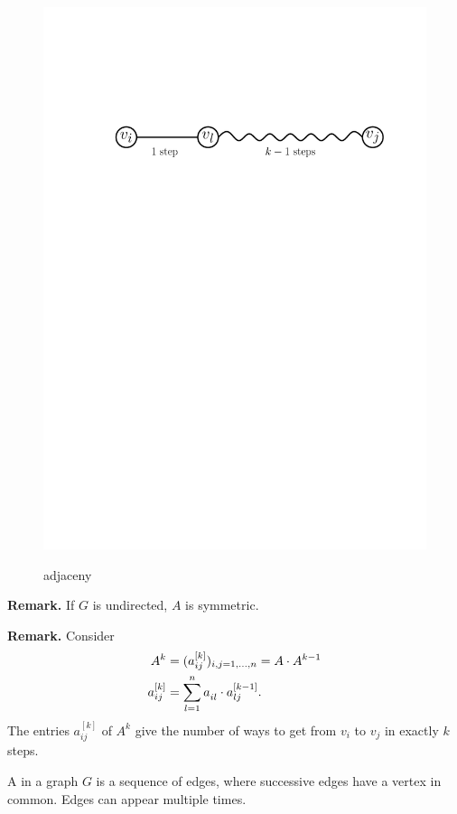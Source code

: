 \begin{figure}[htb]
{	\includegraphics[scale=.5]{01_graph_theory/pics/adjacency_k-induction.pdf}
}
\caption{adjaceny}
\end{figure}
\FloatBarrier

\textbf{Remark.} If $G$ is undirected, $A$ is symmetric.

\textbf{Remark.} Consider
\begin{align*}
A^k &= (a_{ij}^{[k]})_{i,j=1,\ldots,n} = A\cdot A^{k-1} \\
a_{ij}^{[k]} &= \sum_{l=1}^n a_{il}^{\vphantom{[k-1]}}\cdot a_{lj}^{[k-1]}.
\end{align*}
The entries $a_{ij}^{[k]}$ of $A^k$ give the number of ways to get from $v_i$ to $v_j$ in exactly $k$ steps.

\begin{definition}
A  in a graph $G$ is a sequence of edges, where successive edges have
a vertex in common. Edges can appear multiple times.
\end{definition}

